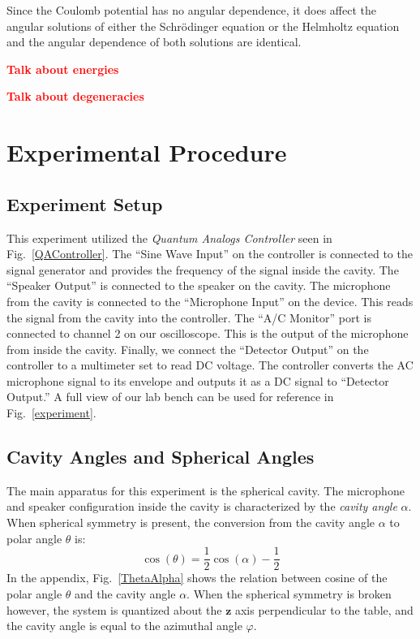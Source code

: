 \documentclass[12pt]{article}
\renewcommand{\vec}[1]{\mathbf{#1}} %
\newcommand{\red}[1]{\textbf{\textcolor{red}{#1}}} %
\newcommand{\figref}[1]{Fig.\ \ref{#1}}
\begin{document}
Since the Coulomb potential has no angular dependence, it does affect the angular solutions of  either the Schr\"odinger equation or the Helmholtz equation and the angular dependence of both solutions are identical. 

\red{Talk about energies}

\red{Talk about degeneracies}

	
\section{Experimental Procedure}

	\subsection{Experiment Setup}
	This experiment utilized the \emph{Quantum Analogs Controller} seen in \figref{QAController}. The ``Sine Wave Input'' on the controller is connected to the signal generator and provides the frequency of the signal inside the cavity. The ``Speaker Output'' is connected to the speaker on the cavity. The microphone from the cavity is connected to the ``Microphone Input'' on the device. This reads the signal from the cavity into the controller. The ``A/C Monitor'' port is connected to channel 2 on our oscilloscope. This is the output of the microphone from inside the cavity. Finally, we connect the ``Detector Output'' on the controller to a multimeter set to read DC voltage. The controller converts the AC microphone signal to its envelope and outputs it as a DC signal to ``Detector Output.'' A full view of our lab bench can be used for reference in \figref{experiment}.
	
	
	\subsection{Cavity Angles and Spherical Angles}
	The main apparatus for this experiment is the spherical cavity. The microphone and speaker configuration inside the cavity is characterized by the \emph{cavity angle} $\alpha$. When spherical symmetry is present, the conversion from the cavity angle $\alpha$ to polar angle $\theta$ is:
		\begin{equation}
		\label{alpha2theta}
		\cos(\theta) = \frac{1}{2}\cos(\alpha) - \frac{1}{2}
		\end{equation}
	In the appendix, \figref{ThetaAlpha} shows the relation between cosine of the polar angle $\theta$ and the cavity angle $\alpha$. When the spherical symmetry is broken however, the system is quantized about the $\vec{z}$ axis perpendicular to the table, and the cavity angle is equal to the azimuthal angle $\varphi$.
	
\end{document}
